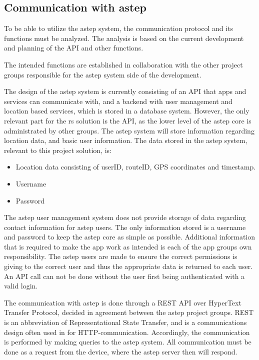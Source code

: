 \subsection{Communication with \gls{astep}}\label{ssec:communicationwithastep}
To be able to utilize the \gls{astep} system, the communication protocol and its functions must be analyzed. 
The analysis is based on the current development and planning of the API and other functions.

The intended functions are established in collaboration with the other project groups responsible for the \gls{astep} system side of the development. 

The design of the \gls{astep} system is currently consisting of an API that apps and services can communicate with, and a backend with user management and location based services, which is stored in a database system.
However, the only relevant part for the \gls{rs} solution is the API, as the lower level of the \gls{astep} core is administrated by other groups.
The \gls{astep} system will store information regarding location data, and basic user information. 
The data stored in the \gls{astep} system, relevant to this project solution, is:
\begin{itemize}
	\item Location data consisting of userID, routeID, GPS coordinates and timestamp.
	\item Username
	\item Password
\end{itemize}

The \gls{astep} user management system does not provide storage of data regarding contact information for \gls{astep} users.
The only information stored is a username and password to keep the \gls{astep} core as simple as possible.
Additional information that is required to make the app work as intended is each of the app groups own responsibility.
The \gls{astep} users are made to ensure the correct permissions is giving to the correct user and thus the appropriate data is returned to each user.
An API call can not be done without the user first being authenticated with a valid login.

The communication with \gls{astep} is done through a REST API over HyperText Transfer Protocol, decided in agreement between the \gls{astep} project groups.
REST is an abbreviation of Representational State Transfer, and is a communications design often used in for HTTP-communication\cite{REST}.
Accordingly, the communication is performed by making queries to the \gls{astep} system. 
All communication must be done as a request from the device, where the \gls{astep} server then will respond.


